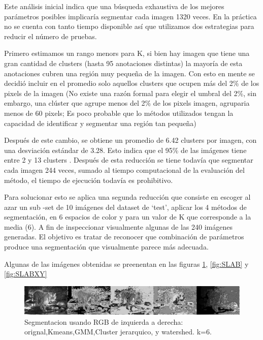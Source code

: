 \documentclass[10pt,twocolumn,letterpaper]{article}
\begin{document}
Este análisis inicial indica que una búsqueda exhaustiva de los mejores parámetros posibles implicaría segmentar cada imagen  1320 veces.  En la práctica no se cuenta con tanto tiempo disponible así que utilizamos dos estrategias para reducir el número de pruebas.

Primero estimamos un rango menors para K, si bien hay imagen que tiene una gran cantidad de clusters (hasta 95 anotaciones distintas) la mayoría de esta anotaciones cubren una región muy pequeña de la imagen. Con esto en mente se decidió incluir en el promedio solo aquellos clusters que ocupen más del 2\% de los pixels de la imagen (No existe una razón formal para elegir el umbral del 2\%, sin embargo, una clúster que agrupe menos del 2\% de los pixels imagen, agruparia menos de 60 pixels; Es poco probable que lo métodos utilizados tengan la capacidad de identificar y segmentar una región tan pequeña) 

Después de este cambio, se obtiene un promedio de 6.42 clusters por imagen, con una desviación estándar de 3.28. Esto indica que el 95\% de las imágenes tiene entre 2 y  13 clusters . Después de esta reducción se tiene todavía que segmentar cada imagen 244 veces, sumado al tiempo computacional de la evaluación del método, el tiempo de ejecución todavía es prohibitivo. 

Para solucionar esto se aplica una segunda reducción que consiste en escoger al azar un sub -set de 10 imágenes del dataset de ‘test’, aplicar los 4 métodos de segmentación, en 6 espacios de color y para un valor de K que corresponde a  la media (6). A fin de inspeccionar visualmente algunas de las 240 imágenes generadas. El objetivo es tratar de reconocer que combinación de parámetros produce una segmentación que visualmente parece más adecuada.

Algunas de las imágenes obtenidas se preenentan en las figuras \ref{fig:sRGB}, \ref{fig:SLAB} y \ref{fig:SLABXY}


\begin{figure}
\begin{center}
\includegraphics[width=0.95\linewidth]
                   {img/RGSample.jpg}
\end{center}
   \caption{Segmentacion usando RGB de izquierda a derecha: orignal,Kmeans,GMM,Cluster jerarquico, y watershed. k=6.}
\label{fig:sRGB}
\end{figure}
\end{document}
